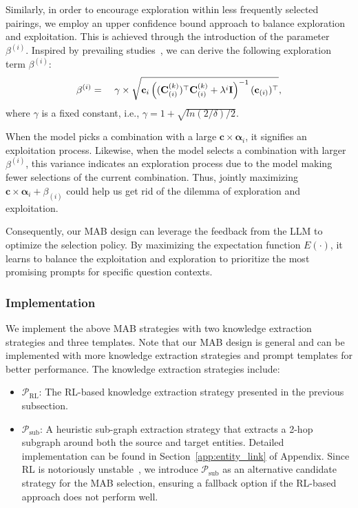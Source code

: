 \documentclass{article}
\theoremstyle{boldremark}
\begin{document}
Similarly, in order to encourage exploration within less frequently selected pairings, we employ an upper confidence bound approach to balance exploration and exploitation. This is achieved through the introduction of the parameter $\beta^{(i)}$. Inspired by prevailing studies~\cite{walsh2012exploring,dong2023active}, we can derive the following exploration term $\beta^{(i)}$:
\begin{equation}%
\begin{aligned}
\beta^{(i)} & = \
&\gamma \times \sqrt{{\bf c}_{i}\left(({\bf C}_{(i)}^{(k)})^{\top} {\bf C}_{(i)}^{(k)} + {\lambda}^{i} \textbf{I}\right)^{-1} ({\bf c}_{(i)})^{\top} },
\end{aligned}
\end{equation}
where $\gamma$ is a fixed constant, i.e., $\gamma= 1+ \sqrt{ln(2/ \delta)/2 }$.

When the model picks a combination with a large $\boldsymbol{c} \times \bm{\alpha}_{i}$, it signifies an exploitation process. 
Likewise, when the model selects a combination with larger $\beta^{(i)}$, this variance indicates an exploration process due to the model making fewer selections of the current combination.  Thus, jointly maximizing $\boldsymbol{c} \times \bm{\alpha}_{i} + \beta_{(i)}$ could help us get rid of the dilemma of exploration and exploitation.

Consequently, our MAB design can leverage the feedback from the LLM to optimize the selection policy. By maximizing the expectation function $E(\cdot)$, it learns to balance the exploitation and exploration to prioritize the most promising prompts for specific question contexts.



\subsubsection{Implementation}
We implement the above MAB strategies with two knowledge extraction strategies and three templates. Note that our MAB design is general and can be implemented with more knowledge extraction strategies and prompt templates for better performance. The knowledge extraction strategies include:

\begin{itemize} [leftmargin=*]
\item $\mathcal{P}_\text{RL}$: The RL-based knowledge extraction strategy presented in the previous subsection.
\item $\mathcal{P}_\text{sub}$: A heuristic sub-graph extraction strategy that extracts a 2-hop subgraph around both the source and target entities. Detailed implementation can be found in Section~\ref{app:entity_link} of Appendix. Since RL is notoriously unstable~\cite{sutton2018reinforcement}, we introduce $\mathcal{P}_\text{sub}$ as an alternative candidate strategy for the MAB selection, ensuring a fallback option if the RL-based approach does not perform well.
\end{itemize}
\end{document}

